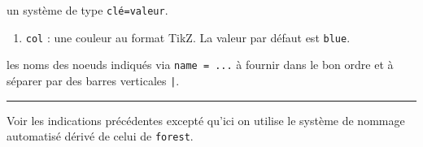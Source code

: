 \documentclass[12pt,a4paper]{article}
\theoremstyle{definition}
\newcommand\separation{
	\medskip
	\hfill\rule{0.5\textwidth}{0.75pt}\hfill
	\medskip
}
\newcommand\extraspace{
	\vspace{0.25em}
}
\begin{document}


\IDoption{} un système de type \texttt{clé=valeur}.

\begin{enumerate}
	\item \verb#col# : une couleur au format TikZ. La valeur par défaut est \verb#blue#.
\end{enumerate}

\IDarg{} les noms des noeuds indiqués via \verb#name = ...# à fournir dans le bon ordre et à séparer par des barres verticales \verb#|#.


\separation





\extraspace
\extraspace

Voir les indications précédentes excepté qu'ici on utilise le système de nommage automatisé dérivé de celui de \verb#forest#.
\end{document}
